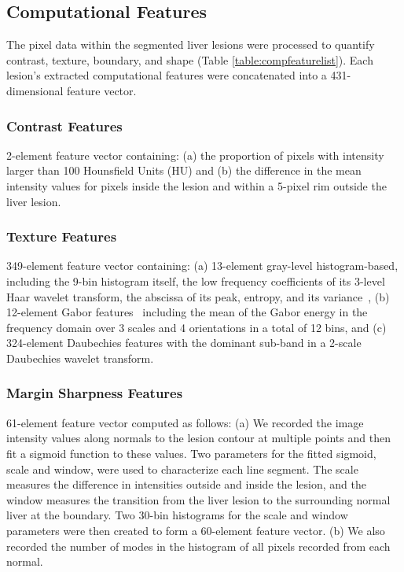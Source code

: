 \clearpage
\subsection{Computational Features}
The pixel data within the segmented liver lesions were processed to quantify contrast, texture, boundary, and shape (Table \ref{table:compfeaturelist}). Each lesion's extracted computational features were concatenated into a 431-dimensional feature vector.

\subsubsection{Contrast Features}
2-element feature vector containing: (a) the proportion of pixels with intensity larger than 100 Hounsfield Units (HU) and (b) the difference in the mean intensity values for pixels inside the lesion and within a 5-pixel rim outside the liver lesion.

\subsubsection{Texture Features}
349-element feature vector containing: (a) 13-element gray-level histogram-based, including the 9-bin histogram itself, the low frequency coefficients of its 3-level Haar wavelet transform, the abscissa of its peak, entropy, and its variance~\cite{Strela:2002vq}, (b) 12-element Gabor features~\cite{Zhao:2005wb} including the mean of the Gabor energy in the frequency domain over 3 scales and 4 orientations in a total of 12 bins, and (c) 324-element Daubechies features with the dominant sub-band in a 2-scale Daubechies wavelet transform.

\subsubsection{Margin Sharpness Features}
61-element feature vector computed as follows: (a) We recorded the image intensity values along normals to the lesion contour at multiple points and then fit a sigmoid function to these values.  Two parameters for the fitted sigmoid, scale and window, were used to characterize each line segment. The scale measures the difference in intensities outside and inside the lesion, and the window measures the transition from the liver lesion to the surrounding normal liver at the boundary. Two 30-bin histograms for the scale and window parameters were then created to form a 60-element feature vector. (b) We also recorded the number of modes in the histogram of all pixels recorded from each normal.

